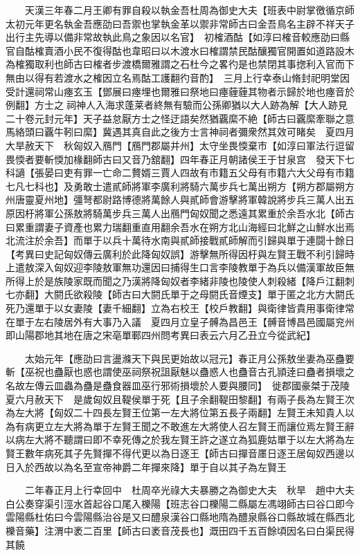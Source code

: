 　　天漢三年春二月王卿有罪自殺以執金吾杜周為御史大夫【班表中尉掌徼循京師太初元年更名執金吾應劭曰吾禦也掌執金革以禦非常師古曰金吾鳥名主辟不祥天子出行主先導以備非常故執此鳥之象因以名官】　初榷酒酤【如淳曰榷音較應劭曰縣官自酤榷賣酒小民不復得酤也韋昭曰以木渡水曰榷謂禁民酤釀獨官開置如道路設木為榷獨取利也師古曰榷者步渡橋爾雅謂之石杜今之畧彴是也禁閉其事揔利入官而下無由以得有若渡水之榷因立名焉酤工護翻彴音酌】　三月上行幸泰山脩封祀明堂因受計還祠常山瘞玄玉【鄧展曰瘞埋也爾雅曰祭地曰瘞薶薶其物者示歸於地也瘞音於例翻】方士之祠神人入海求蓬莱者終無有驗而公孫卿猶以大人跡為解【大人跡見二十卷元封元年】天子益怠厭方士之怪迂語矣然猶覊縻不絶【師古曰覊縻牽聯之意馬絡頭曰覊牛靷曰縻】冀遇其真自此之後方士言神祠者彌衆然其效可睹矣　夏四月大旱赦天下　秋匈奴入鴈門【鴈門郡屬并州】太守坐畏愞棄市【如淳曰軍法行逗留畏愞者要斬愞加椽翻師古曰又音乃舘翻】四年春正月朝諸侯王于甘泉宫　發天下七科讁【張晏曰吏有罪一亡命二贅婿三賈人四故有市籍五父母有市籍六大父母有市籍七凡七科也】及勇敢士遣貳師將軍李廣利將騎六萬步兵七萬出朔方【朔方郡屬朔方州唐靈夏州地】彊弩都尉路博德將萬餘人與貳師會游擊將軍韓說將步兵三萬人出五原因杅將軍公孫敖將騎萬步兵三萬人出鴈門匈奴聞之悉遠其累重於余吾水北【師古曰累重謂妻子資產也累力瑞翻重直用翻余吾水在朔方北山海經曰北鮮之山鮮水出焉北流注於余吾】而單于以兵十萬待水南與貳師接戰貳師解而引歸與單于連闘十餘日　【考異曰史記匈奴傳云廣利於此降匈奴誤】游擊無所得因杅與左賢王戰不利引歸時上遣敖深入匈奴迎李陵敖軍無功還因曰捕得生口言李陵教單于為兵以備漢軍故臣無所得上於是族陵家既而聞之乃漢將降匈奴者李緒非陵也陵使人刺殺緒【降戶江翻刺七亦翻】大閼氏欲殺陵【師古曰大閼氏單于之母閼氏音煙支】單于匿之北方大閼氏死乃還單于以女妻陵【妻千細翻】立為右校王【校戶教翻】與衛律皆貴用事衛律常在單于左右陵居外有大事乃入議　夏四月立皇子髆為昌邑王【髆音博昌邑國屬兖州即山陽郡地其地在唐之宋亳單鄆四州問考異曰表云六月乙丑立今從武紀】

　　太始元年【應劭曰言盪滌天下與民更始故以冠元】春正月公孫敖坐妻為巫蠱要斬【巫祝也蠱厭也惑也謂使巫祠祭祝詛厭魅以蠱惑人也蠱音古孔頴逹曰蠱者損壞之名故左傳云皿蟲為蠱是蠱食器皿巫行邪術損壞於人要與腰同】　徙郡國豪桀于茂陵　夏六月赦天下　是歲匈奴且鞮侯單于死【且子余翻鞮田黎翻】有兩子長為左賢王次為左大將【匈奴二十四長左賢王位第一左大將位第五長子兩翻】左賢王未知貴人以為有病更立左大將為單于左賢王聞之不敢進左大將使人召左賢王而讓位焉左賢王辭以病左大將不聽謂曰即不幸死傳之於我左賢王許之遂立為狐鹿姑單于以左大將為左賢王數年病死其子先賢撣不得代更以為日逐王【師古曰撣音㕓日逐王居匈奴西邊以日入於西故以為名至宣帝神爵二年撣來降】單于自以其子為左賢王

　　二年春正月上行幸回中　杜周卒光祿大夫暴勝之為御史大夫　秋旱　趙中大夫白公奏穿渠引涇水首起谷口尾入櫟陽【班志谷口櫟陽二縣屬左馮翊師古曰谷口即今雲陽縣杜佑曰今雲陽縣治谷是又曰醴泉漢谷口縣地隋為醴泉縣谷口縣故城在縣西北櫟音藥】注渭中袤二百里【師古曰袤音茂長也】溉田四千五百餘頃因名曰白渠民得其饒

